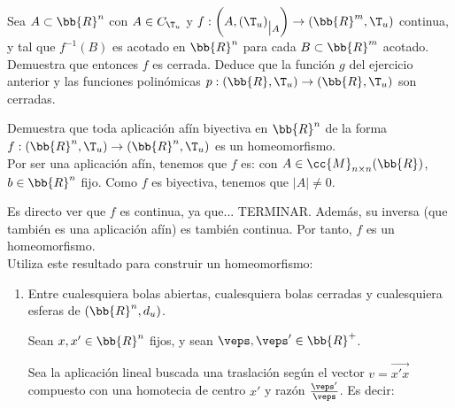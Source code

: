 \begin{ejercicio}
    Sea $A \subset \bb{R}^n$ con $A \in C_{\T_u}$ y $f : \left(A,{(\T_u)}_{\big|A}\right) \to (\bb{R}^m, \T_u)$ continua, y tal que $f^{-1}(B)$ es acotado en $\bb{R}^n$ para cada $B \subset \bb{R}^m$ acotado. Demuestra que entonces $f$ es cerrada.
    Deduce que la función $g$ del ejercicio anterior y las funciones polinómicas $p : (\bb{R}, \T_u) \to (\bb{R}, \T_u)$ son cerradas.
\end{ejercicio}

\begin{ejercicio}
    Demuestra que toda aplicación afín biyectiva en $\bb{R}^n$ de la forma $f : (\bb{R}^n, \T_u) \to (\bb{R}^n, \T_u)$ es un homeomorfismo.\\

    Por ser una aplicación afín, tenemos que $f$ es:
    con $A\in \cc{M}_{n\times n}(\bb{R})$, $b\in \bb{R}^n$ fijo. Como $f$ es biyectiva, tenemos que $|A|\neq 0$.

    Es directo ver que $f$ es continua, ya que... TERMINAR. Además, su inversa (que también es una aplicación afín) es también continua. Por tanto, $f$ es un homeomorfismo.\\
    
    
    Utiliza este resultado para construir un homeomorfismo:
    \begin{enumerate}
        \item Entre cualesquiera bolas abiertas, cualesquiera bolas cerradas y cualesquiera esferas de $(\bb{R}^n, d_u)$.

        Sean $x,x'\in \bb{R}^n$ fijos, y sean $\veps,\veps'\in \bb{R}^+$.
        
        Sea la aplicación lineal buscada una traslación según el vector $v=\vec{x'x}$ compuesto con una homotecia de centro $x'$ y razón $\frac{\veps'}{\veps}$. Es decir:


\end{enumerate}
\end{ejercicio}
